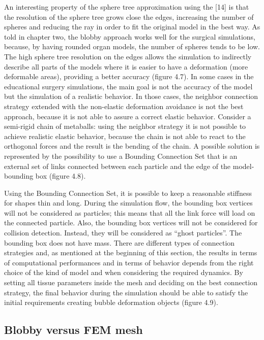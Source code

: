 \documentclass[journal]{vgtc}                %
\begin{document}
An interesting property of the sphere tree approximation using the [14] is that the
resolution of the sphere tree grows close the edges, increasing the number of spheres
and reducing the ray in order to fit the original model in the best way. As told in
chapter two, the blobby approach works well for the surgical simulations, because,
by having rounded organ models, the number of spheres tends to be low. The high
sphere tree resolution on the edges allows the simulation to indirectly describe all
parts of the models where it is easier to have a deformation (more deformable areas),
providing a better accuracy (figure 4.7). In some cases in the educational surgery
simulations, the main goal is not the accuracy of the model but the simulation of a
realistic behavior. In those cases, the neighbor connection strategy extended with the non-elastic deformation avoidance is not the best approach, because it is not able to assure a correct elastic behavior. Consider a semi-rigid chain of metaballs: using the
neighbor strategy it is not possible to achieve realistic elastic behavior, because the
chain is not able to react to the orthogonal forces and the result is the bending of the
chain. A possible solution is represented by the possibility to use a Bounding
Connection Set that is an external set of links connected between each particle and
the edge of the model-bounding box (figure 4.8).

Using the Bounding Connection Set, it is possible to keep a reasonable stiffness for
shapes thin and long. During the simulation flow, the bounding box vertices will not
be considered as particles; this means that all the link force will load on the
connected particle. Also, the bounding box vertices will not be considered for
collision detection. Instead, they will be considered as “ghost particles”. The
bounding box does not have mass. There are different types of connection strategies
and, as mentioned at the beginning of this section, the results in terms of
computational performances and in terms of behavior depends from the right choice
of the kind of model and when considering the required dynamics. By setting all
tissue parameters inside the mesh and deciding on the best connection strategy, the
final behavior during the simulation should be able to satisfy the initial requirements
creating bubble deformation objects (figure 4.9).

\subsection{Blobby versus FEM mesh}
\end{document}
